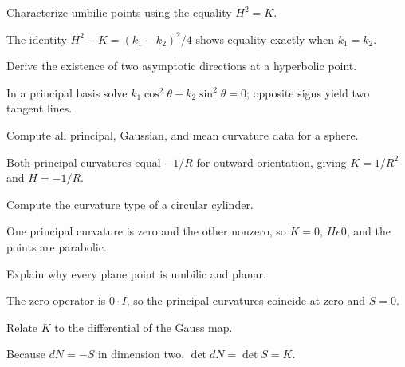 \begin{problem}\label{prob:vii17-05}
Characterize umbilic points using the equality \(H^2=K\).
\end{problem}
\begin{solution}
The identity \(H^2-K=(k_1-k_2)^2/4\) shows equality exactly when \(k_1=k_2\).
\end{solution}

\begin{problem}\label{prob:vii17-06}
Derive the existence of two asymptotic directions at a hyperbolic point.
\end{problem}
\begin{solution}
In a principal basis solve \(k_1\cos^2\theta+k_2\sin^2\theta=0\); opposite signs yield two tangent lines.
\end{solution}

\begin{problem}\label{prob:vii17-07}
Compute all principal, Gaussian, and mean curvature data for a sphere.
\end{problem}
\begin{solution}
Both principal curvatures equal \(-1/R\) for outward orientation, giving \(K=1/R^2\) and \(H=-1/R\).
\end{solution}

\begin{problem}\label{prob:vii17-08}
Compute the curvature type of a circular cylinder.
\end{problem}
\begin{solution}
One principal curvature is zero and the other nonzero, so \(K=0\), \(H
e0\), and the points are parabolic.
\end{solution}

\begin{problem}\label{prob:vii17-09}
Explain why every plane point is umbilic and planar.
\end{problem}
\begin{solution}
The zero operator is \(0\cdot I\), so the principal curvatures coincide at zero and \(S=0\).
\end{solution}

\begin{problem}\label{prob:vii17-10}
Relate \(K\) to the differential of the Gauss map.
\end{problem}
\begin{solution}
Because \(dN=-S\) in dimension two, \(\det dN=\det S=K\).
\end{solution}

